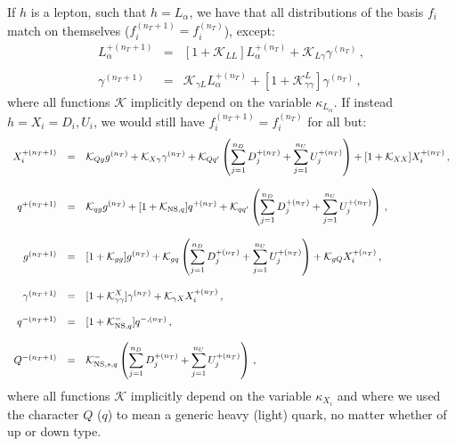 \documentclass[10pt,a4paper]{article}
\begin{document}
If $h$ is a lepton, such that $h=L_\alpha$, we have that all
distributions of the basis $f_i$ match on themselves
($f_i^{(n_T+1)}=f_i^{(n_T)}$), except:
\begin{equation}
\begin{array}{rcl}
 \displaystyle
  L_\alpha^{+(n_T+1)}&=&\displaystyle[1+\mathcal{K}_{LL}]L_\alpha^{+(n_T)}+\mathcal{K}_{L\gamma}\gamma^{(n_T)}\,,\\
\\
  \gamma^{(n_T+1)}&=&\displaystyle \mathcal{K}_{\gamma L} L_\alpha^{+(n_T)} +[1+\mathcal{K}_{\gamma\gamma}^L]\gamma^{(n_T)}\,,
\end{array}
\label{eq:MatchingLeptons}
\end{equation}
where all functions $\mathcal{K}$ implicitly depend on the variable
$\kappa_{L_\alpha}$. If instead $h=X_i=D_i,U_i$, we would still have
$f_i^{(n_T+1)}=f_i^{(n_T)}$ for all but:
\begin{equation}
\begin{array}{rcl}
   X_i^{+(n_T+1)}&=&\displaystyle \mathcal{K}_{Qg}g^{(n_T)} + \mathcal{K}_{X\gamma}\gamma^{(n_T)} +\mathcal{K}_{Qq'}\left(\sum_{j=1}^{n_D} D_j^{+(n_T)}+\sum_{j=1}^{n_U} U_j^{+(n_T)}\right)+[1+\mathcal{K}_{XX}]X_i^{+(n_T)}\,,\\
  \\
   q^{+(n_T+1)}&=&\displaystyle \mathcal{K}_{qg}g^{(n_T)}+[1+\mathcal{K}_{{\rm NS},q}]q^{+(n_T)}+\mathcal{K}_{qq'}\left(\sum_{j=1}^{n_D} D_j^{+(n_T)}+\sum_{j=1}^{n_U} U_j^{+(n_T)}\right)\,,\\
  \\
   g^{(n_T+1)}&=&\displaystyle [1+\mathcal{K}_{gg}]g^{(n_T)}+\mathcal{K}_{gq}\left(\sum_{j=1}^{n_D} D_j^{+(n_T)}+\sum_{j=1}^{n_U} U_j^{+(n_T)}\right) + \mathcal{K}_{gQ}X_i^{+(n_T)}\,,\\
\\
   \gamma^{(n_T+1)}&=&\displaystyle[1+\mathcal{K}_{\gamma\gamma}^X]\gamma^{(n_T)}+\mathcal{K}_{\gamma X}X_i^{+(n_T)}\,,\\
  \\
  q^{-(n_T+1)} &=& [1+\mathcal{K}_{{\rm NS},q}^-]q^{-,(n_T)}\,,\\
\\
  Q^{-(n_T+1)} &=&\displaystyle\mathcal{K}_{{\rm NS},s,q}^-\left(\sum_{j=1}^{n_D} D_j^{+(n_T)}+\sum_{j=1}^{n_U} U_j^{+(n_T)}\right)\,,\\
\end{array}
\label{eq:MatchingQuarks}
\end{equation}
where all functions $\mathcal{K}$ implicitly depend on the variable
$\kappa_{X_i}$ and where we used the character $Q$ ($q$) to mean a
generic heavy (light) quark, no matter whether of up or down type.
\end{document}
